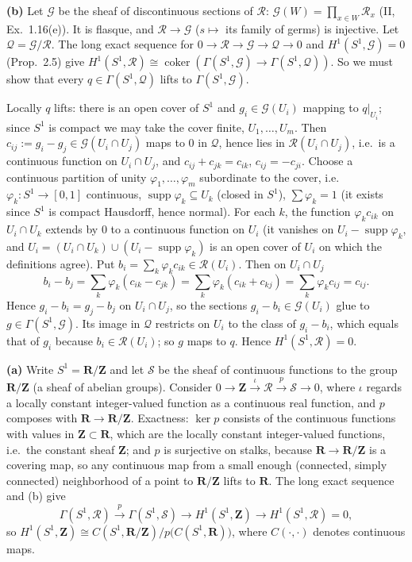 \documentclass[11pt]{article}
\begin{document}
\textbf{(b)} Let $\mathcal G$ be the sheaf of discontinuous sections of $\mathcal R$: $\mathcal G(W)=\prod_{x\in W}\mathcal R_x$ (II, Ex.~1.16(e)). It is flasque, and $\mathcal R\to\mathcal G$ ($s\mapsto$ its family of germs) is injective. Let $\mathcal Q=\mathcal G/\mathcal R$. The long exact sequence for $0\to\mathcal R\to\mathcal G\to\mathcal Q\to0$ and $H^1(S^1,\mathcal G)=0$ (Prop.~2.5) give $H^1(S^1,\mathcal R)\cong\operatorname{coker}(\Gamma(S^1,\mathcal G)\to\Gamma(S^1,\mathcal Q))$. So we must show that every $q\in\Gamma(S^1,\mathcal Q)$ lifts to $\Gamma(S^1,\mathcal G)$.

Locally $q$ lifts: there is an open cover of $S^1$ and $g_i\in\mathcal G(U_i)$ mapping to $q|_{U_i}$; since $S^1$ is compact we may take the cover finite, $U_1,\dots,U_m$. Then $c_{ij}:=g_i-g_j\in\mathcal G(U_{i}\cap U_j)$ maps to $0$ in $\mathcal Q$, hence lies in $\mathcal R(U_i\cap U_j)$, i.e.\ is a continuous function on $U_i\cap U_j$, and $c_{ij}+c_{jk}=c_{ik}$, $c_{ij}=-c_{ji}$. Choose a continuous partition of unity $\varphi_1,\dots,\varphi_m$ subordinate to the cover, i.e.\ $\varphi_k:S^1\to[0,1]$ continuous, $\operatorname{supp}\varphi_k\subseteq U_k$ (closed in $S^1$), $\sum\varphi_k=1$ (it exists since $S^1$ is compact Hausdorff, hence normal). For each $k$, the function $\varphi_kc_{ik}$ on $U_i\cap U_k$ extends by $0$ to a continuous function on $U_i$ (it vanishes on $U_i-\operatorname{supp}\varphi_k$, and $U_i=(U_i\cap U_k)\cup(U_i-\operatorname{supp}\varphi_k)$ is an open cover of $U_i$ on which the definitions agree). Put $b_i=\sum_k\varphi_kc_{ik}\in\mathcal R(U_i)$. Then on $U_i\cap U_j$
\[
b_i-b_j=\sum_k\varphi_k(c_{ik}-c_{jk})=\sum_k\varphi_k(c_{ik}+c_{kj})=\sum_k\varphi_kc_{ij}=c_{ij}.
\]
Hence $g_i-b_i=g_j-b_j$ on $U_i\cap U_j$, so the sections $g_i-b_i\in\mathcal G(U_i)$ glue to $g\in\Gamma(S^1,\mathcal G)$. Its image in $\mathcal Q$ restricts on $U_i$ to the class of $g_i-b_i$, which equals that of $g_i$ because $b_i\in\mathcal R(U_i)$; so $g$ maps to $q$. Hence $H^1(S^1,\mathcal R)=0$.

\textbf{(a)} Write $S^1=\mathbf R/\mathbf Z$ and let $\mathcal S$ be the sheaf of continuous functions to the group $\mathbf R/\mathbf Z$ (a sheaf of abelian groups). Consider $0\to\mathbf Z\xrightarrow{\ \iota\ }\mathcal R\xrightarrow{\ p\ }\mathcal S\to0$, where $\iota$ regards a locally constant integer-valued function as a continuous real function, and $p$ composes with $\mathbf R\to\mathbf R/\mathbf Z$. Exactness: $\ker p$ consists of the continuous functions with values in $\mathbf Z\subset\mathbf R$, which are the locally constant integer-valued functions, i.e.\ the constant sheaf $\mathbf Z$; and $p$ is surjective on stalks, because $\mathbf R\to\mathbf R/\mathbf Z$ is a covering map, so any continuous map from a small enough (connected, simply connected) neighborhood of a point to $\mathbf R/\mathbf Z$ lifts to $\mathbf R$. The long exact sequence and (b) give
\[
\Gamma(S^1,\mathcal R)\xrightarrow{\ p\ }\Gamma(S^1,\mathcal S)\to H^1(S^1,\mathbf Z)\to H^1(S^1,\mathcal R)=0,
\]
so $H^1(S^1,\mathbf Z)\cong C(S^1,\mathbf R/\mathbf Z)/p\bigl(C(S^1,\mathbf R)\bigr)$, where $C(\cdot,\cdot)$ denotes continuous maps.
\end{document}
